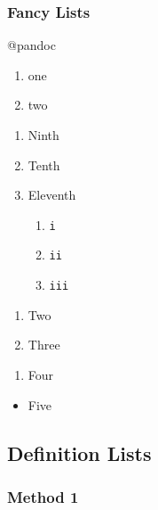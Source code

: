 \documentclass[]{article}
\providecommand{\tightlist}{%
  \setlength{\itemsep}{0pt}\setlength{\parskip}{0pt}}
\begin{document}
\subsubsection{Fancy Lists}\label{fancy-lists}

@pandoc

\begin{enumerate}
\tightlist
\item
  one
\item
  two
\end{enumerate}

\begin{enumerate}
\def\labelenumi{\arabic{enumi})}
\setcounter{enumi}{8}
\tightlist
\item
  Ninth
\item
  Tenth
\item
  Eleventh

  \begin{enumerate}
  \def\labelenumii{\roman{enumii}.}
  \tightlist
  \item
    \texttt{i}
  \item
    \texttt{ii}
  \item
    \texttt{iii}
  \end{enumerate}
\end{enumerate}

\begin{enumerate}
\def\labelenumi{(\arabic{enumi})}
\setcounter{enumi}{1}
\tightlist
\item
  Two
\item
  Three
\end{enumerate}

\begin{enumerate}
\def\labelenumi{\arabic{enumi}.}
\tightlist
\item
  Four
\end{enumerate}

\begin{itemize}
\tightlist
\item
  Five
\end{itemize}

\subsection{Definition Lists}\label{definition-lists}

\subsubsection{Method 1}\label{method-1}
\end{document}
